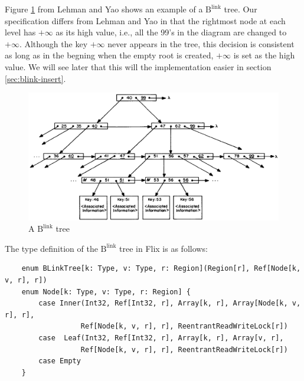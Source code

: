\documentclass[11pt]{report}
\theoremstyle{definition}
\begin{document}
Figure \ref{fig:blink_tree} from Lehman and Yao shows an example of a $\text{B}^{\text{link}}$ tree. Our specification differs from Lehman and Yao in that the rightmost node at each level has $+\infty$ as its high value, i.e., all the 99's in the diagram are changed to $+\infty$. Although the key $+\infty$ never appears in the tree, this decision is consistent as long as in the begning when the empty root is created, $+\infty$ is set as the high value. We will see later that this will the implementation easier in section \ref{sec:blink-insert}.

\begin{figure}[h]
  \centering
  \vspace{0.5em}
  \includegraphics[width=\textwidth]{asset/blink_tree.png}
  \vspace{-1em}
  \caption{A $\text{B}^{\text{link}}$ tree}
  \label{fig:blink_tree}
\end{figure}

The type definition of the $\text{B}^{\text{link}}$ tree in Flix is as follows:
\begin{listing}[H]
  \begin{verbatim}
    enum BLinkTree[k: Type, v: Type, r: Region](Region[r], Ref[Node[k, v, r], r])
    enum Node[k: Type, v: Type, r: Region] {
        case Inner(Int32, Ref[Int32, r], Array[k, r], Array[Node[k, v, r], r],
                  Ref[Node[k, v, r], r], ReentrantReadWriteLock[r])
        case  Leaf(Int32, Ref[Int32, r], Array[k, r], Array[v, r],
                  Ref[Node[k, v, r], r], ReentrantReadWriteLock[r])
        case Empty
    }
\end{verbatim}
\end{listing}
\end{document}
